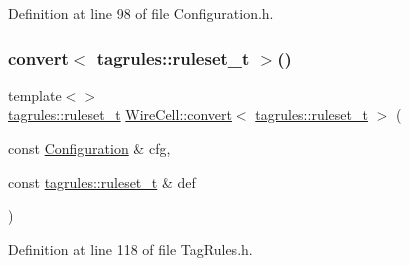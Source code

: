 Definition at line 98 of file Configuration.\+h.

\mbox{\label{namespace_wire_cell_a3f34e0b2564286f437cd0a76970f6806}} 
\subsubsection{\texorpdfstring{convert$<$ tagrules\+::ruleset\+\_\+t $>$()}{convert< tagrules::ruleset\_t >()}}
{\footnotesize\ttfamily template$<$$>$ \\
\hyperlink{namespace_wire_cell_1_1tagrules_a93f5672d7c60d5f990b42dd93fd0aee2}{tagrules\+::ruleset\+\_\+t} \hyperlink{namespace_wire_cell_a5f6648d6ae801b20a17b8a35fd3306e5}{Wire\+Cell\+::convert}$<$ \hyperlink{namespace_wire_cell_1_1tagrules_a93f5672d7c60d5f990b42dd93fd0aee2}{tagrules\+::ruleset\+\_\+t} $>$ (\begin{DoxyParamCaption}\item[{const \hyperlink{namespace_wire_cell_a9f705541fc1d46c608b3d32c182333ee}{Configuration} \&}]{cfg,  }\item[{const \hyperlink{namespace_wire_cell_1_1tagrules_a93f5672d7c60d5f990b42dd93fd0aee2}{tagrules\+::ruleset\+\_\+t} \&}]{def }\end{DoxyParamCaption})\hspace{0.3cm}{\ttfamily [inline]}}



Definition at line 118 of file Tag\+Rules.\+h.

